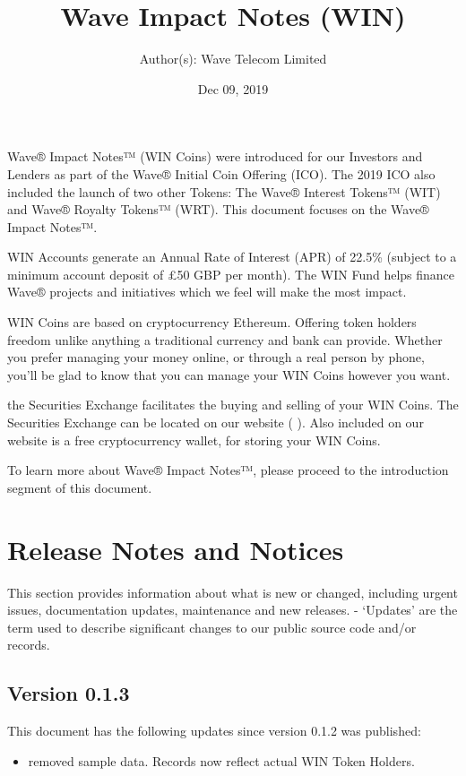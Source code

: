 \documentclass[letterpaper,10pt,openany,oneside,english]{sphinxmanual}
\title{Wave Impact Notes (WIN)}
\date{Dec 09, 2019}
\author{Author(s): Wave Telecom Limited}
\begin{document}
\maketitle
\sphinxtableofcontents
{}\label{\detokenize{index::doc}}


Wave® Impact Notes™ (WIN Coins) were introduced for our Investors and Lenders as part of the Wave® Initial Coin Offering (ICO).
The 2019 ICO also included the launch of two other Tokens: The Wave® Interest Tokens™ (WIT) and Wave® Royalty Tokens™ (WRT).
This document focuses on the Wave® Impact Notes™.

WIN Accounts generate an Annual Rate of Interest (APR) of 22.5\% (subject to a minimum account deposit of £50 GBP per month).
The WIN Fund helps finance Wave® projects and initiatives which we feel will make the most impact.

WIN Coins are based on cryptocurrency Ethereum. Offering token holders freedom unlike anything a traditional currency and bank can provide.
Whether you prefer managing your money online, or through a real person by phone, you’ll be glad to know that you can manage your WIN Coins however you want.

the Securities Exchange facilitates the buying and selling of your WIN Coins.
The Securities Exchange can be located on our website (  ).
Also included on our website is a free cryptocurrency wallet, for storing your WIN Coins.

To learn more about Wave® Impact Notes™, please proceed to the introduction segment of this document.


\chapter{Release Notes and Notices}
\label{\detokenize{releasenotes:release-notes-and-notices}}\label{\detokenize{releasenotes::doc}}
This section provides information about what is new or changed, including urgent issues, documentation updates, maintenance and new releases.
- ‘Updates’ are the term used to describe significant changes to our public source code and/or records.


\section{Version 0.1.3}
\label{\detokenize{releasenotes:version-0-1-3}}
This document has the following updates since version 0.1.2 was published:
\begin{itemize}
\item {} 
removed sample data. Records now reflect actual WIN Token Holders.

\end{itemize}
\end{document}
